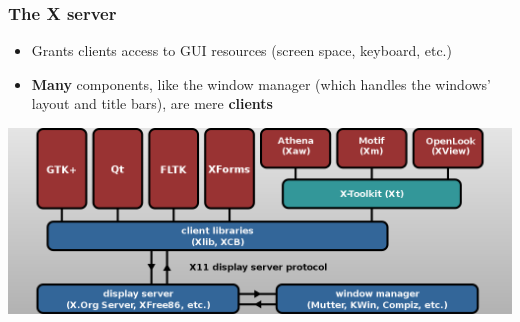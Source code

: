 \documentclass{beamer}
\begin{document}
\begin{frame}
  \frametitle{The X server}
      \begin{itemize}
        \item Grants clients access to GUI resources (screen space, keyboard, etc.)
        \item \textbf{Many} components, like the window manager (which handles the windows' layout and title bars), are mere \textbf{clients}
      \end{itemize}
  \begin{center}
    \includegraphics[width=\textwidth]{X11_Diagram.png}
  \end{center}
\end{frame}
\end{document}
